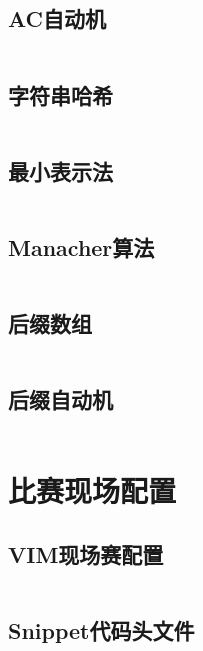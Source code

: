 \documentclass[a4paper,12pt]{article}
\begin{document}
\subsection{AC自动机}
\inputminted[breaklines, linenos]{c++}{string/ac_auto.cc}
\subsection{字符串哈希}
\inputminted[breaklines, linenos]{c++}{string/hash.cc}
\subsection{最小表示法}
\inputminted[breaklines, linenos]{c++}{string/minimal.cc}
\subsection{Manacher算法}
\inputminted[breaklines, linenos]{c++}{string/manacher.cc}
\subsection{后缀数组}
\inputminted[breaklines, linenos]{c++}{string/sa.cc}
\subsection{后缀自动机}
\inputminted[breaklines, linenos]{c++}{string/sam.cc}


\newpage
\section{比赛现场配置}
\subsection{VIM现场赛配置}
\inputminted[breaklines, linenos]{bash}{others/vim.bash}
\subsection{Snippet代码头文件}
\inputminted[breaklines, linenos]{c++}{others/head.cc}
\end{document}
